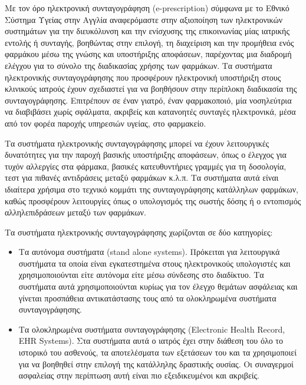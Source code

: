 		Με τον όρο ηλεκτρονική συνταγογράφηση (e-prescription) σύμφωνα με το Εθνικό Σύστημα Υγείας στην Αγγλία αναφερόμαστε στην αξιοποίηση των ηλεκτρονικών συστημάτων για την διευκόλυνση και την ενίσχυσης της επικοινωνίας μίας ιατρικής εντολής ή συνταγής, βοηθώντας στην επιλογή, τη διαχείριση και την προμήθεια ενός φαρμάκου μέσω της γνώσης και υποστήριξης αποφάσεων, παρέχοντας μια διαδρομή ελέγχου για το σύνολο της διαδικασίας χρήσης των φαρμάκων.  Τα συστήματα ηλεκτρονικής συνταγογράφησης που προσφέρουν ηλεκτρονική υποστήριξη στους κλινικούς ιατρούς έχουν σχεδιαστεί για να βοηθήσουν στην περίπλοκη διαδικασία της συνταγογράφησης. \cite{Kierkegaard2013} Επιτρέπουν σε έναν γιατρό, έναν φαρμακοποιό, μία νοσηλεύτρια να διαβιβάσει χωρίς σφάλματα, ακριβείς και κατανοητές συνταγές ηλεκτρονικά, μέσα από τον φορέα παροχής υπηρεσιών υγείας, στο φαρμακείο.  \cite{eprescr}
		
		
		Τα συστήματα ηλεκτρονικής συνταγογράφησης μπορεί να έχουν λειτουργικές δυνατότητες για την παροχή βασικής υποστήριξης αποφάσεων, όπως ο έλεγχος για τυχόν αλλεργίες στα φάρμακα, βασικές κατευθυντήριες γραμμές για τη δοσολογία, τεστ για πιθανές αντιδράσεις μεταξύ φαρμάκων κ.λ.π. Τα συστήματα αυτά είναι ιδιαίτερα χρήσιμα στο τεχνικό κομμάτι της συνταγογράφησης κατάλληλων φαρμάκων, καθώς προσφέρουν λειτουργίες όπως ο υπολογισμός της σωστής δόσης ή ο εντοπισμός αλληλεπιδράσεων μεταξύ των φαρμάκων. \cite{Kart2008}

		Τα συστήματα ηλεκτρονικής συνταγογράφησης χωρίζονται σε δύο κατηγορίες:
		
		\begin{itemize}
		
		\item Τα αυτόνομα συστήματα (stand alone systems). Πρόκειται για λειτουργικά συστήματα τα οποία είναι εγκατεστημένα στους ηλεκτρονικούς υπολογιστές  και χρησιμοποιούνται είτε αυτόνομα είτε μέσω σύνδεσης στο διαδίκτυο.  Τα συστήματα αυτά χρησιμοποιούνται κυρίως για τον έλεγχο θεμάτων ασφάλειας και γίνεται προσπάθεια αντικατάστασης τους από τα ολοκληρωμένα συστήματα συνταγογράφησης.

		\item Τα ολοκληρωμένα συστήματα συνταγογράφησης (Electronic Health Record, EHR Systems). Στα συστήματα αυτά ο ιατρός έχει στην διάθεση του όλο το ιστορικό του ασθενούς, τα αποτελέσματα των εξετάσεων του και τα χρησιμοποιεί για να βοηθηθεί στην επιλογή της κατάλληλης δραστικής ουσίας. Οι συναγερμοί ασφαλείας στην περίπτωση αυτή είναι πιο εξειδικευμένοι και ακριβείς.  

		\end{itemize}
		

